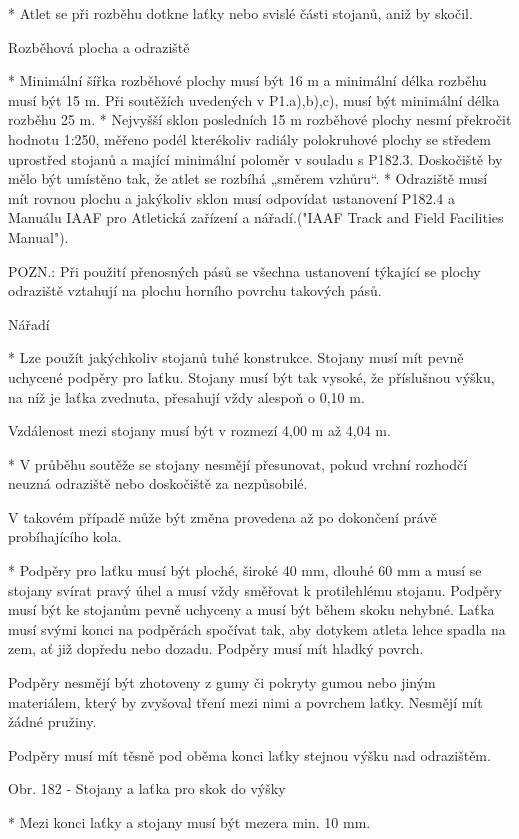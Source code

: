   * Atlet se při rozběhu dotkne laťky nebo svislé části stojanů, aniž by skočil.
  \enditems

Rozběhová plocha a odraziště

* Minimální šířka rozběhové plochy musí být 16 m a minimální délka rozběhu musí být 15 m. Při soutěžích uvedených v P1.a),b),c), musí být minimální délka rozběhu 25 m.
* Nejvyšší sklon posledních 15 m rozběhové plochy nesmí překročit hodnotu 1:250, měřeno podél kterékoliv radiály polokruhové plochy se středem uprostřed stojanů a mající minimální poloměr v souladu s P182.3. Doskočiště by mělo být umístěno tak, že atlet se rozbíhá „směrem vzhůru“.
* Odraziště musí mít rovnou plochu a jakýkoliv sklon musí odpovídat ustanovení P182.4 a Manuálu IAAF pro Atletická zařízení a nářadí.("IAAF Track and Field Facilities Manual").

POZN.: Při použití přenosných pásů se všechna ustanovení týkající se plochy odraziště vztahují na plochu horního povrchu takových pásů.

Nářadí

* Lze použít jakýchkoliv stojanů tuhé konstrukce. Stojany musí mít pevně uchycené podpěry pro laťku. Stojany musí být tak vysoké, že příslušnou výšku, na níž je laťka zvednuta, přesahují vždy alespoň o 0,10 m.

Vzdálenost mezi stojany musí být v rozmezí 4,00 m až 4,04 m.

* V průběhu soutěže se stojany nesmějí přesunovat, pokud vrchní rozhodčí neuzná odraziště nebo doskočiště za nezpůsobilé.

V takovém případě může být změna provedena až po dokončení právě probíhajícího kola.

* Podpěry pro laťku musí být ploché, široké 40 mm, dlouhé 60 mm a musí se stojany svírat pravý úhel a musí vždy směřovat k protilehlému stojanu. Podpěry musí být ke stojanům pevně uchyceny a musí být během skoku nehybné. Laťka musí svými konci na podpěrách spočívat tak, aby dotykem atleta lehce spadla na zem, ať již dopředu nebo dozadu. Podpěry musí mít hladký povrch.

Podpěry nesmějí být zhotoveny z gumy či pokryty gumou nebo jiným materiálem, který by zvyšoval tření mezi nimi a povrchem laťky. Nesmějí mít žádné pružiny.

Podpěry musí mít těsně pod oběma konci laťky stejnou výšku nad odrazištěm.

Obr. 182 - Stojany a laťka pro skok do výšky

* Mezi konci laťky a stojany musí být mezera min. 10 mm.


